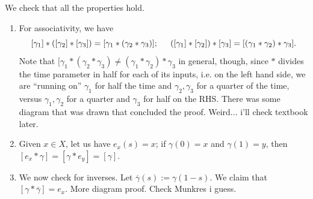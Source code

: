 \noindent We check that all the properties hold.
\begin{enumerate}[label=(\alph*)]
    \item For associativity, we have
    \[ [\gamma_1] \ast ([\gamma_2] \ast [\gamma_3]) = [\gamma_1 \ast (\gamma_2 \ast \gamma_3)]; \hspace{0.2in} ([\gamma_1] \ast [\gamma_2]) \ast [\gamma_3] = [(\gamma_1 \ast \gamma_2) \ast \gamma_3]. \]
    Note that $[\gamma_1 \ast (\gamma_2 \ast \gamma_3) \neq (\gamma_1 \ast \gamma_2) \ast \gamma_3$ in general, though, since $\ast$ divides the time parameter in half for each of its inputs, i.e. on the left hand side, we are ``running on'' $\gamma_1$ for half the time and $\gamma_2, \gamma_3$ for a quarter of the time, versus $\gamma_1, \gamma_2$ for a quarter and $\gamma_3$ for half on the RHS.
    \medskip\newline
    There was some diagram that was drawn that concluded the proof. Weird... i'll check textbook later.
    \item Given $x \in X$, let us have $e_x(s) = x$; if $\gamma(0) = x$ and $\gamma(1) = y$, then $[e_x \ast \gamma] = [\gamma \ast e_y] = [\gamma]$.
    \item We now check for inverses. Let $\overline{\gamma}(s) := \gamma(1-s)$. We claim that $[\gamma \ast \overline{\gamma}] = e_x$. More diagram proof. Check Munkres i guess.
\end{enumerate}
